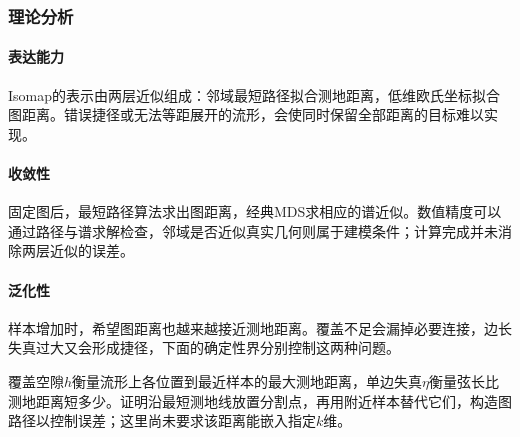 \subsubsection{理论分析}
\label{sec:dim-isomap-theory}

\paragraph{表达能力}
Isomap的表示由两层近似组成：邻域最短路径拟合测地距离，低维欧氏坐标拟合图距离。错误捷径或无法等距展开的流形，会使同时保留全部距离的目标难以实现。

\paragraph{收敛性}
固定图后，最短路径算法求出图距离，经典MDS求相应的谱近似。数值精度可以通过路径与谱求解检查，邻域是否近似真实几何则属于建模条件；计算完成并未消除两层近似的误差。

\paragraph{泛化性}
样本增加时，希望图距离也越来越接近测地距离。覆盖不足会漏掉必要连接，边长失真过大又会形成捷径，下面的确定性界分别控制这两种问题。

覆盖空隙$h$衡量流形上各位置到最近样本的最大测地距离，单边失真$\eta$衡量弦长比测地距离短多少。证明沿最短测地线放置分割点，再用附近样本替代它们，构造图路径以控制误差；这里尚未要求该距离能嵌入指定$k$维。

